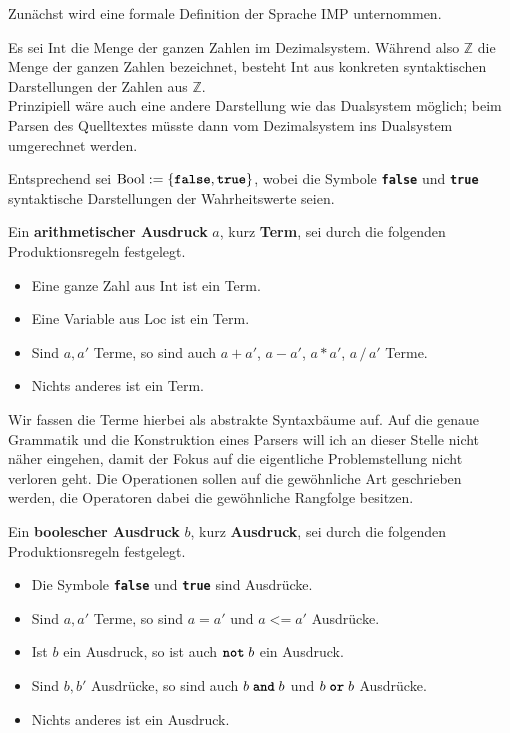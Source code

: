 \documentclass[8pt,fleqn,aspectratio=169]{beamer}
\newcommand{\strong}[1]{\textsf{\textbf{#1}}}
\newcommand{\parspace}{\vspace{0.8em}}
\newcommand{\kw}[1]{\textbf{\texttt{#1}}}
\newcommand{\code}[1]{{\texttt{#1}}}
\newcommand{\Bool}{\mathrm{Bool}}
\newcommand{\Int}{\mathrm{Int}}
\newcommand{\Loc}{\mathrm{Loc}}
\newcommand{\Z}{\mathbb Z}
\begin{document}
\begin{frame}
Zunächst wird eine formale Definition der Sprache IMP unternommen.\pause

\parspace
Es sei $\Int$ die Menge der ganzen Zahlen im Dezimalsystem. Während also
$\Z$ die Menge der ganzen Zahlen bezeichnet, besteht $\Int$ aus konkreten
syntaktischen Darstellungen der Zahlen aus $\Z$.\\
{\footnotesize Prinzipiell wäre auch eine andere Darstellung wie das Dualsystem
möglich; beim Parsen des Quelltextes müsste dann vom Dezimalsystem ins
Dualsystem umgerechnet werden.}\pause

\parspace
Entsprechend sei $\Bool:=\{\kw{false},\kw{true}\}$, wobei die
Symbole \kw{false} und \kw{true} syntaktische Darstellungen der
Wahrheitswerte seien.
\end{frame}

\begin{frame}
Ein \strong{arithmetischer Ausdruck} $a$, kurz \strong{Term}, sei durch die
folgenden Produktionsregeln festgelegt.
\begin{itemize}
\item Eine ganze Zahl aus $\Int$ ist ein Term.
\item Eine Variable aus $\Loc$ ist ein Term.
\item Sind $a,a'$ Terme, so sind auch $a+a'$, $a-a'$, $a*a'$, $a\,/\,a'$ Terme.
\item Nichts anderes ist ein Term.
\end{itemize}
{\footnotesize Wir fassen die Terme hierbei als abstrakte Syntaxbäume auf.
Auf die genaue Grammatik und die Konstruktion eines Parsers will ich
an dieser Stelle nicht näher eingehen, damit der Fokus auf die
eigentliche Problemstellung nicht verloren geht. Die Operationen sollen
auf die gewöhnliche Art geschrieben werden, die Operatoren dabei die
gewöhnliche Rangfolge besitzen.}
\end{frame}

\begin{frame}
Ein \strong{boolescher Ausdruck} $b$, kurz \strong{Ausdruck}, sei durch
die folgenden Produktionsregeln festgelegt.
\begin{itemize}
\item Die Symbole \kw{false} und \kw{true} sind Ausdrücke.
\item Sind $a,a'$ Terme, so sind $a\;\code{=}\;a'$ und $a \;\code{<=}\; a'$ Ausdrücke.
\item Ist $b$ ein Ausdruck, so ist auch $\kw{not}\;b$ ein Ausdruck.
\item Sind $b,b'$ Ausdrücke, so sind auch $b\;\kw{and}\;b$ und $b\;\kw{or}\;b$ Ausdrücke.
\item Nichts anderes ist ein Ausdruck.
\end{itemize}
\end{frame}
\end{document}
